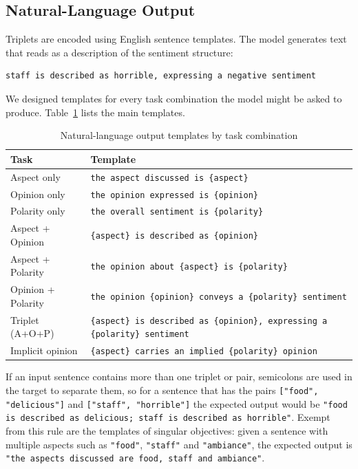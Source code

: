 \documentclass[12pt,a4paper]{report}
\begin{document}
\subsection{Natural-Language Output}\label{sec:nl-templates}

Triplets are encoded using English sentence templates. The model generates text that reads as a description of the sentiment structure:

\begin{lstlisting}
staff is described as horrible, expressing a negative sentiment
\end{lstlisting}

We designed templates for every task combination the model might be asked to produce. Table~\ref{tab:nl-templates} lists the main templates.

\begin{table}[H]
\centering
\caption{Natural-language output templates by task combination}
\label{tab:nl-templates}
\small
\begin{tabular}{@{}lp{11cm}@{}}
\toprule
\textbf{Task} & \textbf{Template} \\
\midrule
Aspect only & \texttt{the aspect discussed is \{aspect\}} \\
Opinion only & \texttt{the opinion expressed is \{opinion\}} \\
Polarity only & \texttt{the overall sentiment is \{polarity\}} \\
\midrule
Aspect + Opinion & \texttt{\{aspect\} is described as \{opinion\}} \\
Aspect + Polarity & \texttt{the opinion about \{aspect\} is \{polarity\}} \\
Opinion + Polarity & \texttt{the opinion \{opinion\} conveys a \{polarity\} sentiment} \\
\midrule
Triplet (A+O+P) & \texttt{\{aspect\} is described as \{opinion\}, expressing a \{polarity\} sentiment} \\
\midrule
Implicit opinion & \texttt{\{aspect\} carries an implied \{polarity\} opinion} \\
\bottomrule
\end{tabular}
\end{table}

If an input sentence contains more than one triplet or pair, semicolons are used in the target 
to separate them, so for a sentence that has the pairs \texttt{["food", "delicious"]} and
 \texttt{["staff", "horrible"]} the expected output would be 
 \texttt{"food is described as delicious; staff is described as horrible"}.
 Exempt from this rule are the templates of singular objectives: 
 given a sentence with multiple aspects such as \texttt{"food"}, \texttt{"staff"} and \texttt{"ambiance"}, the expected output is
 \texttt{"the aspects discussed are food, staff and ambiance"}.
\end{document}
